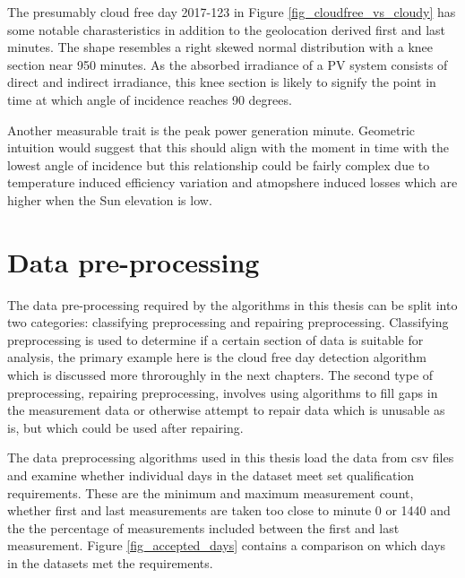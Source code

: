 \noindent The presumably cloud free day 2017-123 in Figure \ref{fig_cloudfree_vs_cloudy} has some notable charasteristics in addition to the geolocation derived first and last minutes. The shape resembles a right skewed normal distribution with a knee section near 950 minutes. As the absorbed irradiance of a PV system consists of direct and indirect irradiance, this knee section is likely to signify the point in time at which angle of incidence reaches 90 degrees.

Another measurable trait is the peak power generation minute. Geometric intuition would suggest that this should align with the moment in time with the lowest angle of incidence but this relationship could be fairly complex due to temperature induced efficiency variation and atmopshere induced losses which are higher when the Sun elevation is low.





\newpage
\section{Data pre-processing}
The data pre-processing required by the algorithms in this thesis can be split into two categories: classifying preprocessing and repairing preprocessing. Classifying preprocessing is used to determine if a certain section of data is suitable for analysis, the primary example here is the cloud free day detection algorithm which is discussed more throroughly in the next chapters. The second type of preprocessing, repairing preprocessing, involves using algorithms to fill gaps in the measurement data or otherwise attempt to repair data  which is unusable as is, but which could be used after repairing.

The data preprocessing algorithms used in this thesis load the data from csv files and examine whether individual days in the dataset meet set qualification requirements. These are the minimum and maximum measurement count, whether first and last measurements are taken too close to minute 0 or 1440 and the the percentage of measurements included between the first and last measurement. Figure \ref{fig_accepted_days} contains a comparison on which days in the datasets met the requirements.


